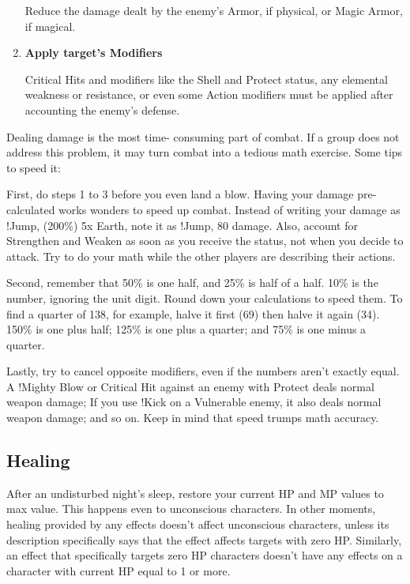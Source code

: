 \begin{multicols}{2}
\begin{enumerate}
Reduce the damage dealt by the enemy's
Armor, if physical, or Magic Armor, if magical.

\item \textbf{Apply target's Modifiers}

Critical Hits and modifiers like the Shell and
Protect status, any elemental weakness or
resistance, or even some Action modifiers must be
applied after accounting the enemy's defense.
\end{enumerate}

\begin{boco}
Dealing damage is the most time-
consuming part of combat. If a group does not
address this problem, it may turn combat into a
tedious math exercise. Some tips to speed it:

First, do steps 1 to 3 before you even land
a blow. Having your damage pre-calculated
works wonders to speed up combat. Instead of
writing your damage as !Jump, (200\%) 5x Earth,
note it as !Jump, 80 damage. Also, account for
Strengthen and Weaken as soon as you receive
the status, not when you decide to attack. Try to
do your math while the other players are
describing their actions.

Second, remember that 50\% is one half,
and 25\% is half of a half. 10\% is the number,
ignoring the unit digit. Round down your
calculations to speed them. To find a quarter of
138, for example, halve it first (69) then halve it
again (34). 150\% is one plus half; 125\% is one
plus a quarter; and 75\% is one minus a quarter.

Lastly, try to cancel opposite modifiers,
even if the numbers aren't exactly equal.
A !Mighty Blow or Critical Hit against an enemy
with Protect deals normal weapon damage; If you
use !Kick on a Vulnerable enemy, it also deals
normal weapon damage; and so on. Keep in mind
that speed trumps math accuracy.
\end{boco}

\subsection{Healing}
After an undisturbed night's sleep, restore
your current HP and MP values to max value. This
happens even to unconscious characters. In other
moments, healing provided by any effects doesn’t
affect unconscious characters, unless its
description specifically says that the effect affects
targets with zero HP. Similarly, an effect that
specifically targets zero HP characters doesn’t
have any effects on a character with current HP
equal to 1 or more.
\end{multicols}

